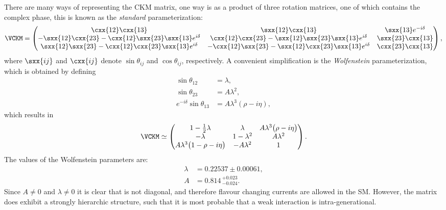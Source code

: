 There are many ways of representing the CKM matrix, one way is as a product of three rotation
matrices, one of which contains the complex phase, this is known as the \emph{standard}
parameterization:
\begin{equation}
  \VCKM =
  \begin{pmatrix}
    \cxx{12}\cxx{13} & \sxx{12}\cxx{13} & \sxx{13}e^{-i\delta} \\
    -\sxx{12}\cxx{23}-\cxx{12}\sxx{23}\sxx{13}e^{i\delta} &
    \cxx{12}\cxx{23}-\sxx{12}\sxx{23}\sxx{13}e^{i\delta} & \sxx{23}\cxx{13} \\
    \sxx{12}\sxx{23}-\cxx{12}\cxx{23}\sxx{13}e^{i\delta} &
    -\cxx{12}\sxx{23}-\sxx{12}\cxx{23}\sxx{13}e^{i\delta} & \cxx{23}\cxx{13} \\
  \end{pmatrix},
\end{equation}
where $\sxx{ij}$ and $\cxx{ij}$ denote $\sin\theta_{ij}$ and $\cos\theta_{ij}$, respectively.
A convenient simplification is the \emph{Wolfenstein} parameterization, which is obtained by
defining
\begin{align}
  \sin\theta_{12}&=\lambda, \nonumber\\
  \sin\theta_{23}&=A\lambda^2, \nonumber\\
  e^{-i\delta}\sin\theta_{13} &= A\lambda^3(\rho-i\eta),
\end{align}
which results in
\begin{align}
  \VCKM\simeq
    \begin{pmatrix}
      1-\tfrac12\lambda & \lambda & A\lambda^3\big(\rho-i\eta\big) \\
      -\lambda & 1-\lambda^2 & A\lambda^2 \\
      A\lambda^3\big(1-\rho-i\eta\big) & -A\lambda^2 & 1 \\
    \end{pmatrix}.
  \label{eq:th:wolfenstein}
\end{align}
The values of the Wolfenstein parameters are:
\begin{align}
  \lambda &= 0.22537\pm0.00061, \nonumber\\ A&=0.814\,^{+0.023}_{-0.024}.
\end{align}
Since $A\neq0$ and $\lambda\neq0$ it is clear that \VCKM is not diagonal, and therefore flavour
changing currents are allowed in the SM.
However, the \ckm matrix does exhibit a strongly hierarchic structure, such that it is most
probable that a weak interaction is intra-generational.


